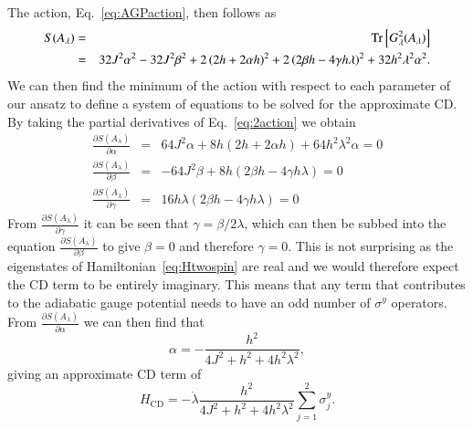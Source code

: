 The action, Eq.~\eqref{eq:AGPaction}, then follows as 
\begin{eqnarray}
    S  (A_\lambda) & = & \Tr \left[G_\lambda^2 (A_\lambda) \right] \nonumber \\
    & = & 32 J^2 \alpha^2 - 32 J^2 \beta^2  + 2 \left( 2 h + 2 \alpha h \right)^2  + 2 \left( 2 \beta h - 4 \gamma h \lambda \right)^2 + 32 h^2 \lambda^2 \alpha^2. \label{eq:2action}
\end{eqnarray}
We can then find the minimum of the action with respect to each parameter of our ansatz to define a system of equations to be solved for the approximate CD. By taking the partial derivatives of Eq.~\eqref{eq:2action} we obtain
\begin{eqnarray}
    \frac{\partial S(A_\lambda)}{\partial \alpha} & = & 64 J^2 \alpha + 8 h \left( 2 h + 2 \alpha h \right) + 64 h^2 \lambda^2 \alpha = 0 \nonumber \\
    \frac{\partial S(A_\lambda)}{\partial \beta} & = & - 64 J^2 \beta + 8h \left( 2\beta h - 4\gamma h \lambda \right) = 0 \nonumber \\
    \frac{\partial S(A_\lambda)}{\partial \gamma} & = & 16 h \lambda \left( 2 \beta h - 4 \gamma h \lambda \right) = 0 \nonumber
\end{eqnarray}
From $\frac{\partial S(A_\lambda)}{\partial \gamma}$ it can be seen that $\gamma = \beta / 2 \lambda$, which can then be subbed into the equation $\frac{\partial S(A_\lambda)}{\partial \beta}$ to give $\beta=0$ and therefore $\gamma=0$. This is not surprising as the eigenstates of Hamiltonian~\eqref{eq:Htwospin} are real and we would therefore expect the CD term to be entirely imaginary. This means that any term that contributes to the adiabatic gauge potential needs to have an odd number of $\sigma^y$ operators. From $\frac{\partial S(A_\lambda)}{\partial \alpha}$ we can then find that
\begin{equation}
    \alpha = -\frac{h^2}{4J^2 + h^2 + 4 h^2 \lambda^2},
\end{equation}
giving an approximate CD term of
\begin{equation}
    H_\text{CD} = - \dot{\lambda} \frac{h^2}{4J^2 + h^2 + 4 h^2 \lambda^2} \sum_{j=1}^2 \sigma^y_j.
\end{equation}

